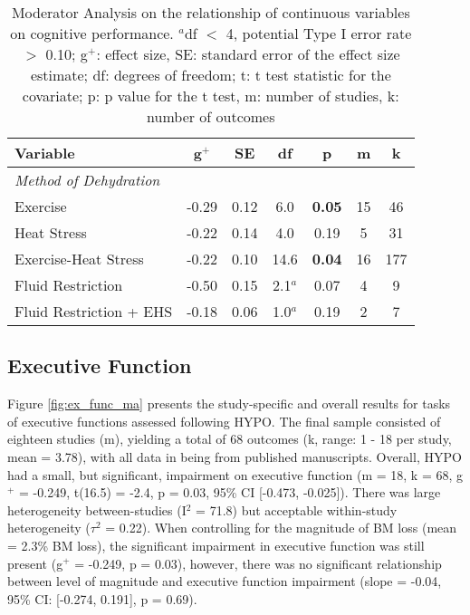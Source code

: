\begin{table}
	\caption{Moderator Analysis on the relationship of continuous variables on cognitive performance. ${^a}$df ${<}$ 4, potential Type I error rate ${>}$ 0.10; g${^+}$: effect size, SE: standard error of the effect size estimate; df: degrees of freedom; t: t test statistic for the covariate; p: p value for the t test, m: number of studies, k: number of outcomes}
	\centering
	
	\begin{tabular}{lcccccc} 
		\hline
		\textbf{Variable} & \textbf{g${^+}$} & \textbf{SE} & \textbf{df} & \textbf{p} & \textbf{m} & 
		\textbf{k} \\
		\hline
		\textit{Method of Dehydration} &&&&&& \\
		Exercise & -0.29 & 0.12 & 6.0 & \textbf{0.05} & 15 & 46 \\
		Heat Stress & -0.22 & 0.14 & 4.0 & 0.19 & 5 & 31 \\
		Exercise-Heat Stress & -0.22 & 0.10 & 14.6 & \textbf{0.04} & 16 & 177 \\
		Fluid Restriction & -0.50 & 0.15 & 2.1${^a}$ & 0.07 & 4 & 9 \\
		Fluid Restriction + EHS	& -0.18 & 0.06 & 1.0${^a}$ & 0.19 & 2 & 7 \\
		\hline		    
	\end{tabular}
	\label{tbl:moderators}
\end{table}

\subsection{Executive Function}
Figure \ref{fig:ex_func_ma} presents the study-specific and overall results for tasks of executive functions assessed following HYPO. The final sample consisted of eighteen studies (m), yielding a total of 68 outcomes (k, range: 1 - 18 per study, mean = 3.78), with all data in being from published manuscripts. Overall, HYPO had a small, but significant, impairment on executive function (m = 18, k = 68, g${^+}$ =  -0.249, t(16.5) = -2.4, p = 0.03, 95\% CI [-0.473, -0.025]). There was large heterogeneity between-studies (I${^2}$ = 71.8) but acceptable within-study heterogeneity (${\tau}$${^2}$ = 0.22). When controlling for the magnitude of BM loss (mean = 2.3\% BM loss), the significant impairment in executive function was still present (g${^+}$ =  -0.249, p = 0.03), however, there was no significant relationship between level of magnitude and executive function impairment (slope = -0.04, 95\% CI: [-0.274, 0.191], p = 0.69). 

